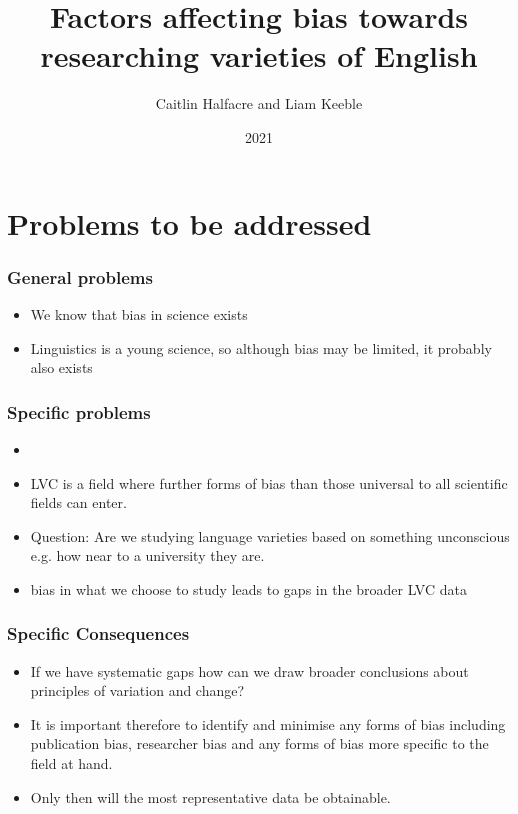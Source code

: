 \documentclass{beamer}
\title{Factors affecting bias towards researching varieties of English}
\author{Caitlin Halfacre and Liam Keeble}
\date{2021}
\begin{document}
\frame{\titlepage}


\section{Problems to be addressed}
\begin{frame}
\frametitle{General problems}
\begin{itemize}
\item We know that bias in science exists
\item Linguistics is a young science, so although bias may be limited, it probably also exists
\end{itemize}
\end{frame}


\begin{frame}
\frametitle{Specific problems}
\begin{itemize}
\item \item LVC is a field where further forms of bias than those universal to all scientific fields can enter.
\item Question: Are we studying language varieties based on something unconscious \\ e.g. how near to a university they are.
\item bias in what we choose to study leads to gaps in the broader LVC data
\end{itemize}
\end{frame}

\begin{frame}
\frametitle{Specific Consequences}
\begin{itemize}
\item If we have systematic gaps how can we draw broader conclusions about principles of variation and change?
\item It is important therefore to identify and minimise any forms of bias including publication bias, researcher bias and any forms of bias more specific to the field at hand.
\item Only then will the most representative data be obtainable.
\end{itemize}
\end{frame}
\end{document}
